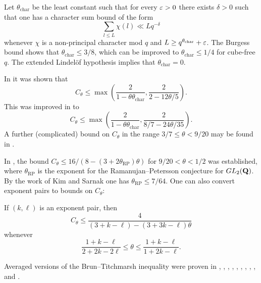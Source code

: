 Let $\theta_{\mathrm{char}}$ be the least constant such that for every $\varepsilon>0$ there exists $\delta>0$ such that one has a character sum bound of the form
$$ \sum_{l \leq L} \chi(l) \ll L q^{-\delta}$$
whenever $\chi$ is a non-principal character mod $q$ and $L \geq q^{\theta_{\mathrm{char}}}+\varepsilon$.  The Burgess bound \cite{burgess, burgess2} shows that $\theta_{\mathrm{char}} \leq 3/8$, which can be improved to $\theta_{\mathrm{char}} \leq 1/4$ for cube-free $q$.  The extended Lindel\"of hypothesis implies that $\theta_{\mathrm{char}}=0$.

In \cite[Theorem 3]{iwaniec_1982} it was shown that
$$ C_\theta \leq \max( \frac{2}{1 - \theta \theta_{\mathrm{char}}}, \frac{2}{2-12\theta/5}).$$
This was improved in \cite{lou-yao-1986} to
$$ C_\theta \leq \max( \frac{2}{1 - \theta \theta_{\mathrm{char}}}, \frac{2}{8/7-24\theta/35}).$$
A further (complicated) bound on $C_\theta$ in the range $3/7 \leq \theta < 9/20$ may be found in \cite[Theorem 2]{baker}.

In \cite{xi-zheng}, the bound $C_\theta \leq 16/(8-(3+2\theta_{\mathrm{RP}})\theta)$ for $9/20 < \theta < 1/2$ was established, where $\theta_{\mathrm{RP}}$ is the exponent for the Ramanujan--Petersson conjecture for $GL_2(\mathbf{Q})$.  By the work of Kim and Sarnak \cite{kim2003refined} one has $\theta_{\mathrm{RP}} \leq 7/64$.  One can also convert exponent pairs to bounds on $C_\theta$:

\begin{theorem}\label{convert}\cite[Theorem 1.4]{xi-zheng} If $(k,\ell)$ is an exponent pair, then
    $$ C_\theta \leq \frac{4}{(3+k-\ell) - (3+3k-\ell)\theta}$$
whenever
$$ \frac{1+k-\ell}{2+2k-2\ell} \leq \theta \leq \frac{1+k-\ell}{1+2k-\ell}.$$
\end{theorem}

Averaged versions of the Brun--Titchmarsh inequality were proven in \cite{HooleyBT1}, \cite{Hooleypa}, \cite{iwaniec_1982}, \cite{deshouillers-iwaniec-BT}, \cite{Fouvry1984}, \cite{Fouvry1985} \cite{mikawa_1991}, \cite{baker-harman-1996}, \cite{baker-harman-677}, \cite{FouvryRadziwill2022}, \cite{li_average_2025} and \cite{li_PrimesInAP_2026}.

